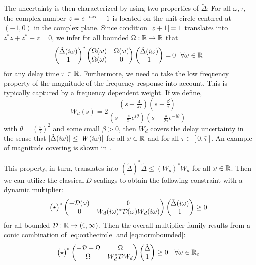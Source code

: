 The uncertainty is then characterized by using two properties of $\tilde \Delta$: For all $\omega,\tau$, the complex number $z=e^{-i\omega{\tau}}-1$ is located on the unit circle centered at $(-1,0)$ in the complex plane. Since condition $\displaystyle \left|z+1\right|=1$ translates into $z^*z+z^*+z=0$, we infer
for all bounded $\Omega:\mathbb{R}\to\mathbb{R}$ that
\begin{equation}
\begin{pmatrix}\tilde{\Delta}(i\omega)\\1\end{pmatrix}^*\begin{pmatrix}\Omega(\omega) &\Omega(\omega)\\ \Omega(\omega) &0\end{pmatrix}\begin{pmatrix}\tilde{\Delta}(i\omega)\\1\end{pmatrix} = 0\ \ \forall\omega\in\mathbb{R}
\label{eq:onthecircle}
\end{equation}
for any delay time $\tau\in\mathbb{R}$. Furthermore, we need to take the low frequency property of the magnitude of the frequency response into account. This is typically captured by a frequency dependent weight. If we define,
\begin{equation*}
W_d(s)= 2\frac{(s+ \frac{4}{\pi\bar{\tau}}) (s+ \frac{\beta}{\bar{\tau}})}{(s-\frac{\pi}{2\bar{\tau}}e^{i\theta})(s-\frac{\pi}{2\bar{\tau}}e^{-i\theta})}
\end{equation*}
with $\theta=\left( \frac{\pi}{2}\right)^2$ and some small $\beta>0$, then $W_d$ covers the delay uncertainty in the sense that $|\tilde{\Delta}(i\omega)|\leq |W(i\omega)|$ for all $\omega\in\mathbb{R}$ and for all $\tau\in [0,\bar{\tau}]$. An example of magnitude covering is shown in .

This property, in turn, translates into $(\tilde{\Delta})^*\tilde{\Delta}\leq (W_d)^*W_d$ for all $\omega\in\mathbb{R}$. Then we can utilize the classical $D$-scalings to obtain the following constraint with a dynamic multiplier:
\begin{equation}
\begin{pmatrix}\star\end{pmatrix}^*\begin{pmatrix}-\mathcal{D}(\omega) &0\\0 &W_d(i\omega)^*\mathcal{D}(\omega)W_d(i\omega)\end{pmatrix}\begin{pmatrix}\tilde{\Delta}(i\omega)\\1\end{pmatrix} \geq 0
\label{eq:normbounded}
\end{equation}
for all bounded $\mathcal{D}:\mathbb{R}\to (0,\infty)$. Then the overall multiplier family results from a  conic combination of \eqref{eq:onthecircle} and \eqref{eq:normbounded}:
\[
\begin{pmatrix}\star\end{pmatrix}^*\begin{pmatrix}-\mathcal{D}+\Omega &\Omega\\
\Omega &W_d^*\mathcal{D}W_d\end{pmatrix}\begin{pmatrix}\tilde{\Delta}\\1\end{pmatrix}
\geq 0 \quad \forall\omega\in\mathbb{R}_e
\]